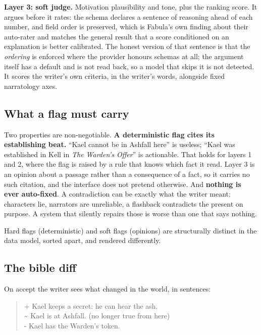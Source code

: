 \documentclass{article}
\begin{document}
\textbf{Layer 3: soft judge.} Motivation plausibility and tone, plus the ranking score.
It argues before it rates: the schema declares a sentence of reasoning ahead of each
number, and field order is preserved, which is Fabula's own finding about their auto-rater
and matches the general result that a score conditioned on an explanation is better
calibrated. The honest version of that sentence is that the \emph{ordering} is enforced
where the provider honours schemas at all; the argument itself has a default and is not
read back, so a model that skips it is not detected. It scores the writer's own criteria, in
the writer's words, alongside fixed narratology axes.



\subsection{What a flag must carry}

Two properties are non-negotiable. \textbf{A deterministic flag cites its establishing
beat.} ``Kael cannot be in Ashfall here'' is useless; ``Kael was established in Kell in
\emph{The Warden's Offer}'' is actionable. That holds for layers 1 and 2, where the flag is
raised by a rule that knows which fact it read. Layer 3 is an opinion about a passage rather
than a consequence of a fact, so it carries no such citation, and the interface does not
pretend otherwise. And \textbf{nothing is ever auto-fixed}. A contradiction
can be exactly what the writer meant: characters lie, narrators are unreliable, a flashback
contradicts the present on purpose. A system that silently repairs those is worse than one
that says nothing.

Hard flags (deterministic) and soft flags (opinions) are structurally distinct in the data
model, sorted apart, and rendered differently.


\subsection{The bible diff}

On accept the writer sees what changed in the world, in sentences:

\begin{quote}\ttfamily\small
+ Kael keeps a secret: he can hear the ash.\\
\textasciitilde{} Kael is at Ashfall. (no longer true from here)\\
- Kael has the Warden's token.
\end{quote}
\end{document}
